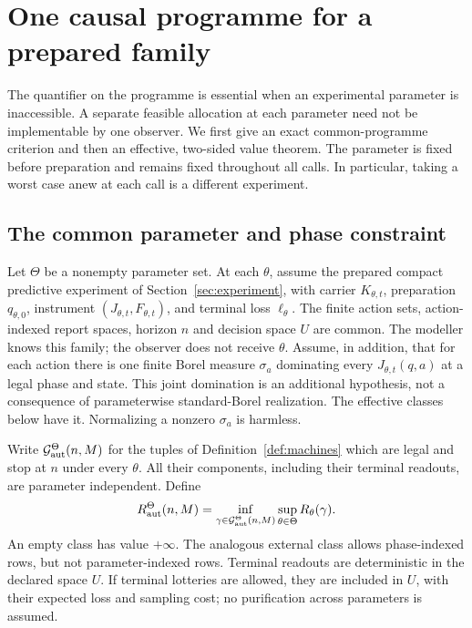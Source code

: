 \section{One causal programme for a prepared family}\label{sec:uniform}
The quantifier on the programme is essential when an experimental parameter is inaccessible. A separate feasible allocation at each parameter need not be implementable by one observer. We first give an exact common-programme criterion and then an effective, two-sided value theorem. The parameter is fixed before preparation and remains fixed throughout all calls. In particular, taking a worst case anew at each call is a different experiment.

\subsection{The common parameter and phase constraint}
Let $\Theta$ be a nonempty parameter set. At each $\theta$, assume the prepared compact predictive experiment of Section~\ref{sec:experiment}, with carrier $K_{\theta,t}$, preparation $q_{\theta,0}$, instrument $(J_{\theta,t},F_{\theta,t})$, and terminal loss $\ell_\theta$. The finite action sets, action-indexed report spaces, horizon $n$ and decision space $U$ are common. The modeller knows this family; the observer does not receive $\theta$. Assume, in addition, that for each action there is one finite Borel measure $\sigma_a$ dominating every $J_{\theta,t}(q,a)$ at a legal phase and state. This joint domination is an additional hypothesis, not a consequence of parameterwise standard-Borel realization. The effective classes below have it. Normalizing a nonzero $\sigma_a$ is harmless.

Write $\mathcal G_{\mathrm{aut}}^{\Theta}(n,M)$ for the tuples of Definition~\ref{def:machines} which are legal and stop at $n$ under every $\theta$. All their components, including their terminal readouts, are parameter independent. Define
\begin{equation}\label{eq:robust_risk}
 R^\Theta_{\mathrm{aut}}(n,M)=\inf_{\gamma\in\mathcal G_{\mathrm{aut}}^{\Theta}(n,M)}
                         \sup_{\theta\in\Theta} R_\theta(\gamma).
\end{equation}
An empty class has value $+\infty$. The analogous external class allows phase-indexed rows, but not parameter-indexed rows. Terminal readouts are deterministic in the declared space $U$. If terminal lotteries are allowed, they are included in $U$, with their expected loss and sampling cost; no purification across parameters is assumed.

